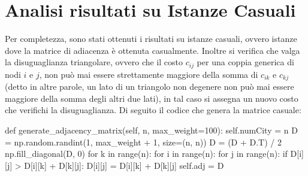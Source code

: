\documentclass[a4paper,12pt]{report}
\begin{document}
\section{Analisi risultati su Istanze Casuali}
Per completezza, sono stati ottenuti i risultati su istanze casuali, ovvero istanze dove la matrice di adiacenza è ottenuta casualmente. Inoltre si verifica che valga la disuguaglianza triangolare, ovvero che il costo $c_{ij}$ per una coppia generica di nodi $i$ e $j$, non può mai essere strettamente maggiore della somma di $c_{ik}$ e $c_{kj}$ (detto in altre parole, un lato di un triangolo non degenere non può mai essere maggiore della somma degli altri due lati), in tal caso si assegna un nuovo costo che verifichi la disuguaglianza. Di seguito il codice che genera la matrice casuale:
\begin{python}
def generate_adjacency_matrix(self, n, max_weight=100):
  self.numCity = n
  D = np.random.randint(1, max_weight + 1, size=(n, n)) 
  D = (D + D.T) / 2
  np.fill_diagonal(D, 0)
  for k in range(n):
    for i in range(n):
      for j in range(n):
        if D[i][j] > D[i][k] + D[k][j]:
          D[i][j] = D[i][k] + D[k][j]
  self.adj = D
\end{python}
\end{document}
